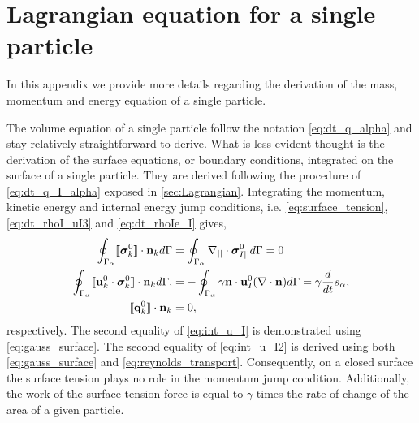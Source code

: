  \section{Lagrangian equation for a single particle}
\label{ap:particles_eq}
In this appendix we provide more details regarding the derivation of the mass, momentum and energy equation of a single particle. 

The volume equation of a single particle follow the notation \ref{eq:dt_q_alpha} and stay relatively straightforward to derive.
What is less evident thought is the derivation of the surface equations, or boundary conditions, integrated on the surface of a single particle. 
They are derived following the procedure of \ref{eq:dt_q_I_alpha} exposed in \ref{sec:Lagrangian}. 
Integrating the momentum, kinetic energy and internal energy jump conditions, i.e.  \ref{eq:surface_tension}, \ref{eq:dt_rhoI_uI3} and  \ref{eq:dt_rhoIe_I}  gives, 
\begin{align}
    \label{eq:int_u_I}
    \oint_{\Gamma_\alpha} \llbracket \bm{\sigma}_k^0 \rrbracket \cdot \textbf{n}_k  d\Gamma
    &=
    \oint_{\Gamma_\alpha} \mathbf{\nabla}_{||}\cdot\bm\sigma^0_{I||} d\Gamma = 0\\
    \label{eq:int_u_I2}
    \oint_{\Gamma_\alpha} \llbracket \textbf{u}_k^0 \cdot \bm{\sigma}_k^0 \rrbracket \cdot \textbf{n}_k d\Gamma,
    &=
    -\oint_{\Gamma_\alpha} \gamma\textbf{n}\cdot \textbf{u}_{I}^0(\mathbf{\nabla}\cdot \textbf{n}) d\Gamma
    = \gamma \frac{d}{dt} s_\alpha,\\
    \llbracket \textbf{q}_k^0 \rrbracket \cdot \textbf{n}_k
    &=
    0,
\end{align}
respectively. 
The second equality of \ref{eq:int_u_I} is demonstrated using \ref{eq:gauss_surface}. 
The second equality of \ref{eq:int_u_I2} is derived using both \ref{eq:gauss_surface} and \ref{eq:reynolds_transport}. 
Consequently, on a closed surface the surface tension plays no role in the momentum jump condition.
Additionally, the work of the surface tension force is equal to $\gamma$ times the rate of change of the area of a given particle. 

